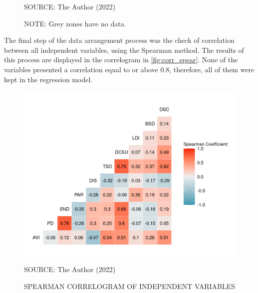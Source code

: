 \begin{figure}[!htbp]
\begin{subfigure}{0.5\textwidth}
    \end{subfigure}    
    \label{fig:taz_sp}
    \par SOURCE: The Author (2022)
    \par NOTE: Grey zones have no data.
\end{figure}


The final step of the data arrangement process was the check of correlation between all independent variables, using the Spearman method. The results of this process are displayed in the correlogram in \autoref{fig:corr_spear}. None of the variables presented a correlation equal to or above 0.8, therefore, all of them were kept in the regression model.  

\begin{figure}[!htbp]
    \centering\footnotesize
    \captionsetup{font=footnotesize}
    \caption{SPEARMAN CORRELOGRAM OF INDEPENDENT VARIABLES}
    \includegraphics{fig/spear.png}
    \label{fig:corr_spear}
    \par SOURCE: The Author (2022)
\end{figure}


